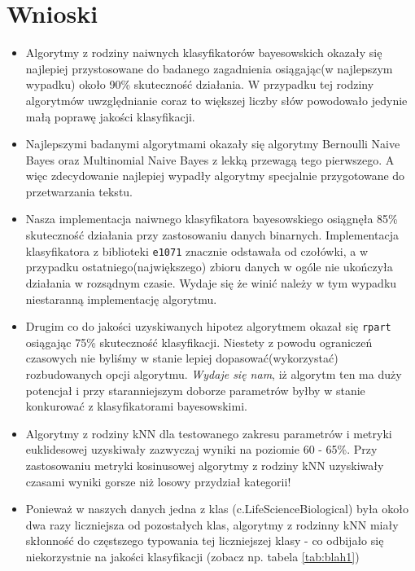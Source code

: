 \documentclass[a4paper,12pt]{article}
\begin{document}
		 \clearpage
		 \newpage
\section{Wnioski}

	\begin{itemize}
		\item
			Algorytmy z rodziny naiwnych klasyfikatorów bayesowskich
			okazały się najlepiej przystosowane do badanego zagadnienia
			osiągając(w najlepszym wypadku) około 90\% skuteczność działania. 
			W przypadku tej rodziny algorytmów uwzględnianie coraz to większej
			liczby słów powodowało jedynie małą poprawę jakości klasyfikacji.
		\item
			Najlepszymi badanymi algorytmami okazały się algorytmy 
			Bernoulli Naive Bayes oraz Multinomial Naive Bayes z lekką przewagą
			tego pierwszego. A więc zdecydowanie najlepiej wypadły algorytmy 
			specjalnie przygotowane do przetwarzania tekstu.
		\item
			Nasza implementacja naiwnego klasyfikatora bayesowskiego osiągnęła
			85\% skuteczność działania przy zastosowaniu danych binarnych.
			Implementacja klasyfikatora z biblioteki \texttt{e1071} znacznie
			odstawała od czołówki, a w przypadku ostatniego(największego) zbioru
			danych w ogóle nie ukończyła działania w rozsądnym czasie.
			Wydaje się że winić należy w tym wypadku niestaranną implementację algorytmu. 
			
		\item
			Drugim co do jakości uzyskiwanych hipotez algorytmem okazał się 
			\texttt{rpart} osiągając 75\% skuteczność klasyfikacji.
			Niestety z powodu ograniczeń czasowych nie byliśmy w stanie 
			lepiej dopasować(wykorzystać) rozbudowanych opcji algorytmu.
			\emph{Wydaje się nam}, iż algorytm ten ma duży potencjał i przy staranniejszym
			doborze parametrów byłby w stanie konkurować z klasyfikatorami bayesowskimi.
			
			
		\item
			Algorytmy z rodziny kNN dla testowanego zakresu parametrów i metryki
			euklidesowej uzyskiwały zazwyczaj
			wyniki na poziomie 60 - 65\%. Przy zastosowaniu metryki kosinusowej algorytmy
			z rodziny kNN uzyskiwały czasami wyniki gorsze niż losowy przydział kategorii!
		
		\item
			Ponieważ w naszych danych jedna z klas (c.LifeScienceBiological) była
			około dwa razy liczniejsza od pozostałych klas, algorytmy z rodzinny kNN
			miały skłonność do częstszego typowania tej liczniejszej klasy - co odbijało
			się niekorzystnie na jakości klasyfikacji (zobacz np. tabela \ref{tab:blah1})
			

\end{itemize}
\end{document}
